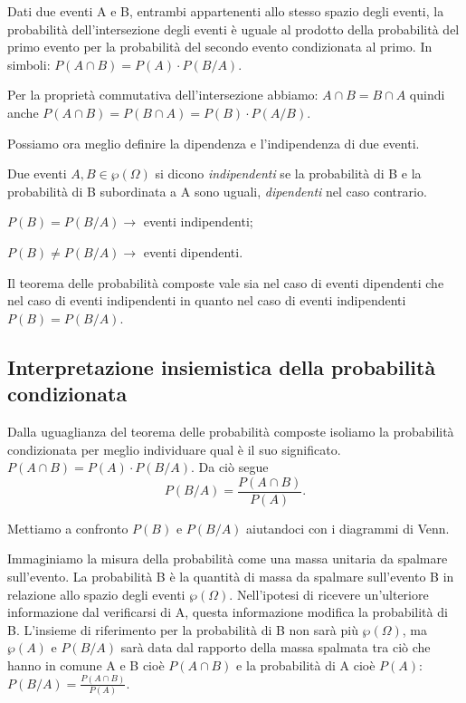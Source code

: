 \begin{teorema}
Dati due eventi A e B, entrambi appartenenti allo stesso spazio degli eventi, la 
probabilità dell'intersezione degli eventi è uguale al prodotto della 
probabilità del primo evento per la probabilità del secondo evento condizionata 
al primo. In simboli: $P(A\cap B)=P(A)\cdot P(B/A)$.
\end{teorema}

Per la proprietà commutativa dell'intersezione abbiamo: $A\cap B=B\cap A$ quindi 
anche $P(A\cap B)=P(B\cap A)=P(B)\cdot P(A/B)$.

Possiamo ora meglio definire la dipendenza e l'indipendenza di due eventi.

\begin{definizione}
Due eventi $A,B\in \wp (\Omega )$ si dicono \emph{indipendenti} se la 
probabilità di B e la probabilità di B subordinata a A sono uguali, 
\emph{dipendenti} nel caso contrario.

$P(B)=P(B/A)\to$ eventi indipendenti;

 ${P}(B)\neq P(B/A)\to$ eventi dipendenti.
\end{definizione}

\osservazione Il teorema delle probabilità composte vale sia nel caso di eventi 
dipendenti che nel caso di eventi indipendenti in quanto nel caso di eventi 
indipendenti $P(B)=P(B/A)$.

\subsection{Interpretazione insiemistica della probabilità condizionata}
Dalla uguaglianza del teorema delle probabilità composte isoliamo la probabilità 
condizionata per meglio individuare qual è il suo significato. $P(A\cap 
B)=P(A)\cdot P(B/A)$. Da ciò segue 
\[P(B/A)=\frac{P(A\cap B)}{P(A)}.\]

Mettiamo a confronto $P(B)$ e $P(B/A)$ aiutandoci con i diagrammi di Venn.
\begin{center}
 
\end{center}
Immaginiamo la misura della probabilità come una massa unitaria da spalmare 
sull'evento. La probabilità B è la quantità di massa da spalmare sull'evento B 
in relazione allo spazio degli eventi $\wp (\Omega )$. Nell'ipotesi di ricevere 
un'ulteriore informazione dal verificarsi di A, questa informazione modifica la 
probabilità di B. L'insieme di riferimento per la probabilità di B non sarà più 
$\wp (\Omega )$, ma $\wp (A)$ e $P(B/A)$ sarà data dal rapporto della massa 
spalmata tra ciò che hanno in comune A e B cioè $P(A\cap B)$ e la probabilità di 
A cioè $P(A)$: $P(B/A)=\frac{P(A\cap B)}{P(A)}$.

